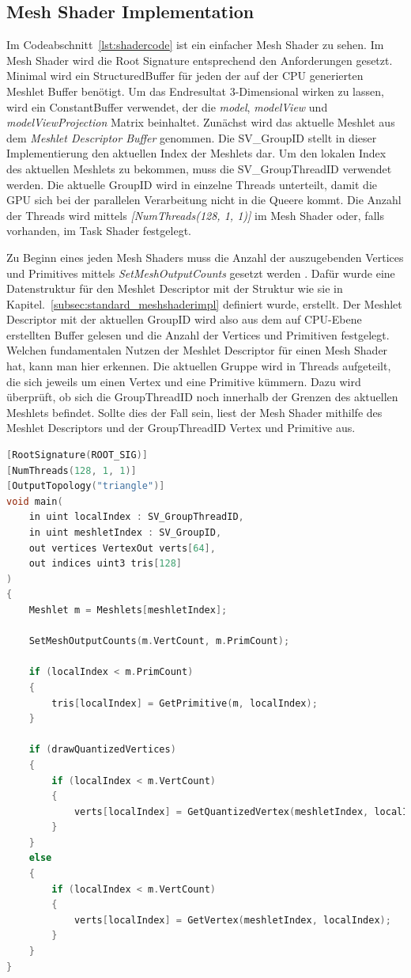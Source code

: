 \subsection{Mesh Shader Implementation}
\label{subsec:mesh_shader_impl}
Im Codeabschnitt~\ref{lst:shadercode} ist ein einfacher Mesh Shader zu sehen.
Im Mesh Shader wird die Root Signature entsprechend den Anforderungen gesetzt.
Minimal wird ein StructuredBuffer für jeden der auf der CPU generierten Meshlet Buffer benötigt.
Um das Endresultat 3-Dimensional wirken zu lassen, wird ein ConstantBuffer verwendet, der die \textit{model}, \textit{modelView} und \textit{modelViewProjection} Matrix beinhaltet.
Zunächst wird das aktuelle Meshlet aus dem \textit{Meshlet Descriptor Buffer} genommen.
Die SV\_GroupID stellt in dieser Implementierung den aktuellen Index der Meshlets dar.
Um den lokalen Index des aktuellen Meshlets zu bekommen, muss die SV\_GroupThreadID verwendet werden.
Die aktuelle GroupID wird in einzelne Threads unterteilt, damit die GPU sich bei der parallelen Verarbeitung nicht in die Queere kommt.
Die Anzahl der Threads wird mittels \textit{[NumThreads(128, 1, 1)]} im Mesh Shader oder, falls vorhanden, im Task Shader festgelegt. \newline

Zu Beginn eines jeden Mesh Shaders muss die Anzahl der auszugebenden Vertices und Primitives mittels \textit{SetMeshOutputCounts} gesetzt werden \cite{Jobalia2019}.
Dafür wurde eine Datenstruktur für den Meshlet Descriptor mit der Struktur wie sie in Kapitel.~\ref{subsec:standard_meshshaderimpl} definiert wurde, erstellt.
Der Meshlet Descriptor mit der aktuellen GroupID wird also aus dem auf CPU-Ebene erstellten Buffer gelesen und die Anzahl der Vertices und Primitiven festgelegt.
Welchen fundamentalen Nutzen der Meshlet Descriptor für einen Mesh Shader hat, kann man hier erkennen.
Die aktuellen Gruppe wird in Threads aufgeteilt, die sich jeweils um einen Vertex und eine Primitive kümmern.
Dazu wird überprüft, ob sich die GroupThreadID noch innerhalb der Grenzen des aktuellen Meshlets befindet.
Sollte dies der Fall sein, liest der Mesh Shader mithilfe des Meshlet Descriptors und der GroupThreadID Vertex und Primitive aus.

\newpage \begin{lstlisting}[language = C++, caption = Standard Mesh Shader main-Methode, label=lst:shadercode]
[RootSignature(ROOT_SIG)]
[NumThreads(128, 1, 1)]
[OutputTopology("triangle")]
void main(
    in uint localIndex : SV_GroupThreadID,
    in uint meshletIndex : SV_GroupID,
    out vertices VertexOut verts[64],
    out indices uint3 tris[128]
)
{
  	Meshlet m = Meshlets[meshletIndex];

	SetMeshOutputCounts(m.VertCount, m.PrimCount);

	if (localIndex < m.PrimCount)
	{
  		tris[localIndex] = GetPrimitive(m, localIndex);
	}

	if (drawQuantizedVertices)
	{
  		if (localIndex < m.VertCount)
  		{
    		verts[localIndex] = GetQuantizedVertex(meshletIndex, localIndex);
  		}
	}
	else
	{
  		if (localIndex < m.VertCount)
  		{
    		verts[localIndex] = GetVertex(meshletIndex, localIndex);
  		}
	}
}
\end{lstlisting}

